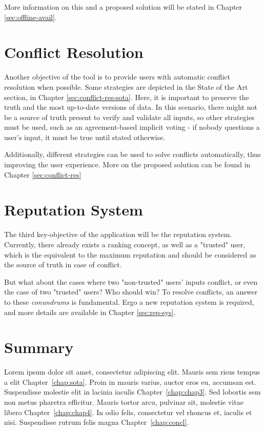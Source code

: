 More information on this and a proposed solution will be stated in Chapter \ref{sec:offline-avail}.

\section{Conflict Resolution} \label{sec:conflict-res-intro}

Another objective of the tool is to provide users with automatic conflict resolution when possible. Some strategies are depicted in the State of the Art section, in Chapter \ref{sec:conflict-res-sota}. Here, it is important to preserve the truth and the most up-to-date versions of data. In this scenario, there might not be a source of truth present to verify and validate all inputs, so other strategies must be used, such as an agreement-based implicit voting - if nobody questions a user's input, it must be true until stated otherwise.

Additionally, different strategies can be used to solve conflicts automatically, thus improving the user experience. More on the proposed solution can be found in Chapter \ref{sec:conflict-res} 

\section{Reputation System} \label{sec:rep-sys-intro}

The third key-objective of the application will be the reputation system. Currently, there already exists a ranking concept, as well as a "trusted" user, which is the equivalent to the maximum reputation and should be considered as the source of truth in case of conflict.

But what about the cases where two "non-trusted" users' inputs conflict, or even the case of two "trusted" users? Who should win? To resolve conflicts, an answer to these \textit{conundrums} is fundamental. Ergo a new reputation system is required, and more details are available in Chapter \ref{sec:rep-sys}.

\section{Summary} \label{sec:summary-intro}

Lorem ipsum dolor sit amet, consectetur adipiscing elit.
Mauris sem risus tempus a elit Chapter~\ref{chap:sota}.
Proin in mauris varius, auctor eros eu, accumsan est.
Suspendisse molestie elit in lacinia iaculis Chapter~\ref{chap:chap3}.
Sed lobortis sem non metus pharetra efficitur. Mauris tortor arcu,
pulvinar sit, molestie vitae libero Chapter~\ref{chap:chap4}.
In odio felis, consectetur vel rhoncus et, iaculis et nisi.
Suspendisse rutrum felis magna Chapter~\ref{chap:concl}.

